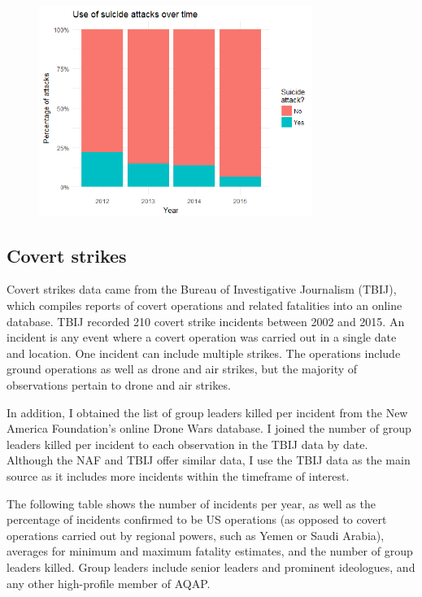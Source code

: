 \documentclass[letterpaper,12pt]{article}
\theoremstyle{definition}
\begin{document}
\begin{figure}[htb!]
  \includegraphics[width=3.5in]{attack_suicide.png}
\end{figure}

\subsection{Covert strikes}

Covert strikes data came from the Bureau of Investigative Journalism (TBIJ), which compiles reports of covert operations and related fatalities into an online database. TBIJ recorded 210 covert strike incidents between 2002 and 2015. An incident is any event where a covert operation was carried out in a single date and location. One incident can include multiple strikes. The operations include ground operations as well as drone and air strikes, but the majority of observations pertain to drone and air strikes. 

In addition, I obtained the list of group leaders killed per incident from the New America Foundation's online Drone Wars database. I joined the number of group leaders killed per incident to each observation in the TBIJ data by date. Although the NAF and TBIJ offer similar data, I use the TBIJ data as the main source as it includes more incidents within the timeframe of interest.

The following table shows the number of incidents per year, as well as the percentage of incidents confirmed to be US operations (as opposed to covert operations carried out by regional powers, such as Yemen or Saudi Arabia), averages for minimum and maximum fatality estimates, and the number of group leaders killed. Group leaders include senior leaders and prominent ideologues, and any other high-profile member of AQAP. 
\end{document}
